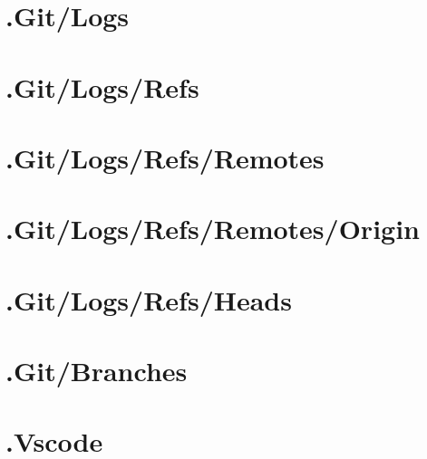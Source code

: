 \section*{.Git/Logs}

\section*{.Git/Logs/Refs}

\section*{.Git/Logs/Refs/Remotes}

\section*{.Git/Logs/Refs/Remotes/Origin}

\section*{.Git/Logs/Refs/Heads}

\section*{.Git/Branches}

\section*{.Vscode}

